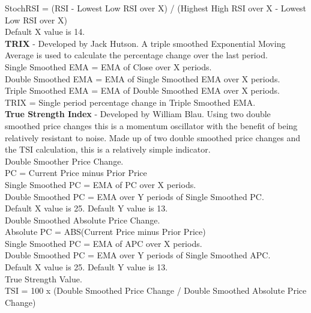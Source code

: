 \documentclass[12pt,a4paper]{article}
\begin{document}
\noindent
StochRSI = (RSI - Lowest Low RSI over X) / (Highest High RSI over X - Lowest Low RSI over X)\\
Default X value is 14.\\

\iffalse
[]
\fi

\noindent
\textbf{TRIX} - Developed by Jack Hutson. A triple smoothed Exponential Moving Average is used to calculate the percentage change over the last period.\\

\noindent
Single Smoothed EMA = EMA of Close over X periods.\\
Double Smoothed EMA = EMA of Single Smoothed EMA over X periods.\\
Triple Smoothed EMA = EMA of Double Smoothed EMA over X periods.\\
TRIX = Single period percentage change in Triple Smoothed EMA. \\

\iffalse
[]
\fi

\noindent
\textbf{True Strength Index} - Developed by William Blau. Using two double smoothed price changes this is a momentum oscillator with the benefit of being relatively resistant to noise. Made up of two double smoothed price changes and the TSI calculation, this is a relatively simple indicator.\\

\noindent
Double Smoother Price Change.\\
PC = Current Price minus Prior Price\\
Single Smoothed PC = EMA of PC over X periods.\\
Double Smoothed PC = EMA over Y periods of Single Smoothed PC.\\
Default X value is 25. Default Y value is 13.\\

\noindent
Double Smoothed Absolute Price Change. \\
Absolute PC = ABS(Current Price minus Prior Price)\\
Single Smoothed PC = EMA of APC over X periods.\\
Double Smoothed PC = EMA over Y periods of Single Smoothed APC.\\
Default X value is 25. Default Y value is 13.\\

\noindent
True Strength Value.\\
TSI = 100 x (Double Smoothed Price Change / Double Smoothed Absolute Price Change)\\
\end{document}
